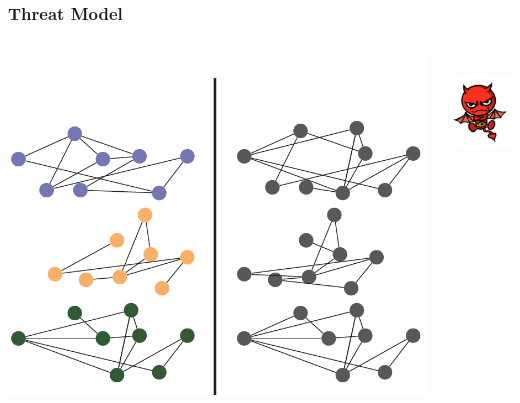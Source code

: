 \documentclass[hyperref={colorlinks = true},unknownkeysallowed]{beamer}
\begin{document}
\begin{frame}
	\frametitle{Threat Model}
	\begin{columns}
		\begin{column}{0.6\textwidth}
				\includegraphics[scale=0.5]{figs/network_setting.png}
		\end{column}
			\begin{column}{0.4\textwidth}
				\hspace{1cm}
		\includegraphics[width=3cm, height=3cm]{figs/adv1.png}
	\end{column}	
	\end{columns}
\end{frame}
\end{document}
